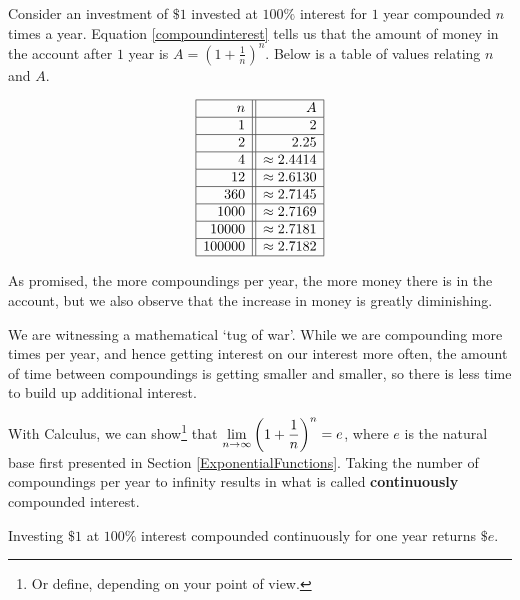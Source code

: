 \documentclass{ximera}
\begin{document}
Consider an investment of $\$ 1$ invested at $100 \%$ interest for $1$ year compounded $n$ times a year.  Equation \ref{compoundinterest} tells us that the amount of money in the account after $1$ year is $A = \left(1+\frac{1}{n}\right)^{n}$.  Below is a table of values relating $n$ and $A$.

\[ \begin{array}{|r||r|}  

\hline

 n & A   \\ \hline
1  & 2  \\  \hline
2  & 2.25  \\  \hline
4 & \approx 2.4414  \\  \hline
12 & \approx 2.6130  \\  \hline
360  & \approx  2.7145 \\  \hline
1000  & \approx 2.7169 \\  \hline
10000  & \approx 2.7181  \\  \hline
100000 & \approx 2.7182  \\  \hline
\end{array} \]

As promised, the more compoundings per year, the more money there is in the account, but we also observe that the increase in money is greatly diminishing.  

\smallskip

We are witnessing a mathematical `tug of war'.  While we are compounding more times per year, and hence getting interest on our interest more often, the amount of time between compoundings is getting smaller and smaller, so there is less time to build up additional interest. 

\smallskip

With Calculus, we can show\footnote{Or define, depending on your point of view.} that $\ds{\lim_{n \rightarrow \infty} \left(1+\frac{1}{n}\right)^{n} = e}$, where $e$ is the natural base first presented in Section \ref{ExponentialFunctions}.  Taking the number of compoundings per year to infinity results in what is called  \textbf{continuously} compounded interest.  

\smallskip

\colorbox{ResultColor}{\bbm

\begin{thm} \label{whatise} Investing $\$1$ at $100 \%$ interest compounded continuously for one year returns $\$ e$. 

\end{thm}

\ebm}
\end{document}

